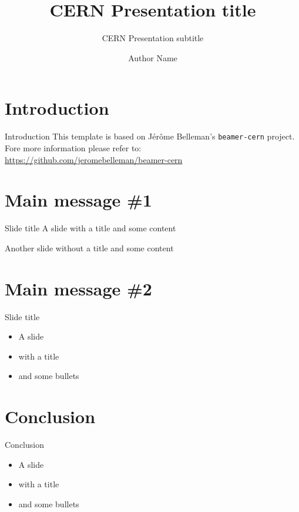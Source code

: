 \documentclass{beamer}
\author{Author Name}
\title{CERN Presentation title}
\subtitle{CERN Presentation subtitle}
\begin{document}
\frontcover

\frame{\titlepage}

\frame{\tableofcontents}

\section{Introduction}

\begin{frame}{Introduction}
This template is based on Jérôme Belleman's \texttt{beamer-cern} project. Fore more information please refer to: \small{\url{https://github.com/jeromebelleman/beamer-cern}}
\end{frame}

\section{Main message \#1}
\frame{\sectionpage}

\begin{frame}{Slide title}
A slide with a title and some content
\end{frame}

\begin{frame}
Another slide without a title and some content
\end{frame}

\section{Main message \#2}
\frame{\sectionpage}

\begin{frame}{Slide title}
	\begin{itemize}
		\item A slide
		\item with a title
		\item and some bullets
	\end{itemize}
\end{frame}

\section{Conclusion}

\begin{frame}{Conclusion}
	\begin{itemize}
		\item A slide
		\item with a title
		\item and some bullets
	\end{itemize}
\end{frame}

\backcover
\end{document}
